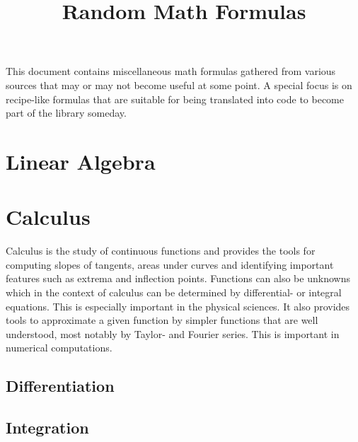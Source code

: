 \documentclass[12pt]{article}
\begin{document}
	
\parindent=0in
\parskip=0pt
		
 \setcounter{page}{1}

\title{Random Math Formulas}
\maketitle

\section{}
This document contains miscellaneous math formulas gathered from various sources that may or may not become useful at some point. A special focus is on recipe-like formulas that are suitable for being translated into code to become part of the library someday.

\tableofcontents





\section{Linear Algebra}


\section{Calculus}
Calculus is the study of continuous functions and provides the tools for computing slopes of tangents, areas under curves and identifying important features such as extrema and inflection points. Functions can also be unknowns which in the context of calculus can be determined by differential- or integral equations. This is especially important in the physical sciences. It also provides tools to approximate a given function by simpler functions that are well understood, most notably by Taylor- and Fourier series. This is important in numerical computations.
\subsection{Differentiation}
\subsection{Integration} 
  
\end{document}
